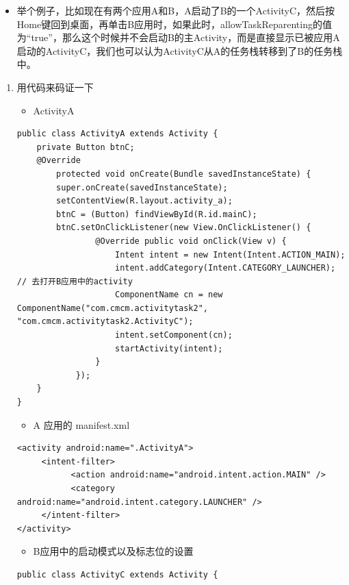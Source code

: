\documentclass[9pt, b5paaper]{book}
\begin{document}
\begin{enumerate}
\begin{itemize}
\item 举个例子，比如现在有两个应用A和B，A启动了B的一个ActivityC，然后按Home键回到桌面，再单击B应用时，如果此时，allowTaskReparenting的值为“true”，那么这个时候并不会启动B的主Activity，而是直接显示已被应用A启动的ActivityC，我们也可以认为ActivityC从A的任务栈转移到了B的任务栈中。
\end{itemize}
\begin{enumerate}
\item 用代码来码证一下
\label{sec-4-9-2-1-1}
\begin{itemize}
\item ActivityA
\end{itemize}
\begin{verbatim}
public class ActivityA extends Activity {
    private Button btnC;
    @Override
        protected void onCreate(Bundle savedInstanceState) {
        super.onCreate(savedInstanceState);
        setContentView(R.layout.activity_a);
        btnC = (Button) findViewById(R.id.mainC);
        btnC.setOnClickListener(new View.OnClickListener() {
                @Override public void onClick(View v) {
                    Intent intent = new Intent(Intent.ACTION_MAIN);
                    intent.addCategory(Intent.CATEGORY_LAUNCHER); // 去打开B应用中的activity 
                    ComponentName cn = new ComponentName("com.cmcm.activitytask2", "com.cmcm.activitytask2.ActivityC");
                    intent.setComponent(cn);
                    startActivity(intent);
                }
            });
    }
}
\end{verbatim}
\begin{itemize}
\item A 应用的 manifest.xml
\end{itemize}
\begin{verbatim}
<activity android:name=".ActivityA">
     <intent-filter>
           <action android:name="android.intent.action.MAIN" />
           <category android:name="android.intent.category.LAUNCHER" />
     </intent-filter>
</activity>
\end{verbatim}
\begin{itemize}
\item B应用中的启动模式以及标志位的设置
\end{itemize}
\begin{verbatim}
public class ActivityC extends Activity {

\end{verbatim}
\end{enumerate}
\end{enumerate}
\end{document}
